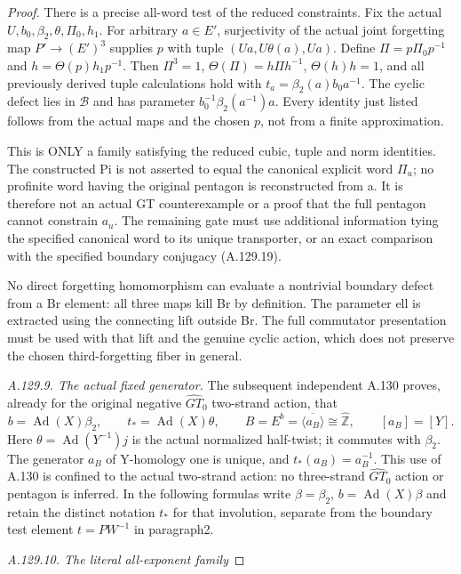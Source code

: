 \begin{proof}
There is a precise all-word test of the reduced constraints. Fix the actual
\(U,b_0,\beta_2,\theta,\Pi_0,h_1\). For arbitrary \(a\in E'\),
surjectivity of the actual joint forgetting map \(P'\to(E')^3\)
supplies \(p\) with tuple \((Ua,U\theta(a),Ua)\). Define
\(\Pi=p\Pi_0p^{-1}\) and \(h=\Theta(p)h_1p^{-1}\). Then
\(\Pi^3=1\), \(\Theta(\Pi)=h\Pi h^{-1}\), \(\Theta(h)h=1\),
and all previously derived tuple calculations hold with
\(t_a=\beta_2(a)b_0a^{-1}\). The cyclic defect lies in
\(\mathcal B\) and has parameter \(b_0^{-1}\beta_2(a^{-1})a\).
Every identity just listed follows from the actual maps and the chosen
\(p\), not from a finite approximation.

This is ONLY a family satisfying the reduced cubic, tuple and norm identities. The constructed Pi is not asserted to equal the canonical explicit word \(\Pi_u\); no profinite word having the original pentagon is reconstructed from a. It is therefore not an actual GT counterexample or a proof that the full pentagon cannot constrain \(a_u\). The remaining gate must use additional information tying the specified canonical word to its unique transporter, or an exact comparison with the specified boundary conjugacy (A.129.19).

No direct forgetting homomorphism can evaluate a nontrivial boundary defect from a Br element: all three maps kill Br by definition. The parameter ell is extracted using the connecting lift outside Br. The full commutator presentation must be used with that lift and the genuine cyclic action, which does not preserve the chosen third-forgetting fiber in general.

\par\smallskip\noindent\emph{A.129.9. The actual fixed generator.}
The subsequent independent A.130 proves, already for the original
negative \(\widehat{GT}_0\) two-strand action, that
\[
 b=\operatorname{Ad}(X)\beta_2,\qquad
 t_*=\operatorname{Ad}(X)\theta,\qquad
 B=E^b=\overline{\langle a_B\rangle}\cong\widehat{\mathbb Z},
 \qquad [a_B]=[Y].
\]
Here \(\theta=\operatorname{Ad}(Y^{-1})j\) is the actual normalized
half-twist; it commutes with \(\beta_2\). The generator \(a_B\) of
Y-homology one is unique, and \(t_*(a_B)=a_B^{-1}\). This use of
A.130 is confined to the actual two-strand action: no three-strand
\(\widehat{GT}_0\) action or pentagon is inferred. In the following
formulas write \(\beta=\beta_2\), \(b=\operatorname{Ad}(X)\beta\)
and retain the distinct notation \(t_*\) for that involution, separate
from the boundary test element \(t=PW^{-1}\) in paragraph2.
\par\smallskip\noindent\emph{A.129.10. The literal all-exponent family}


\end{proof}

